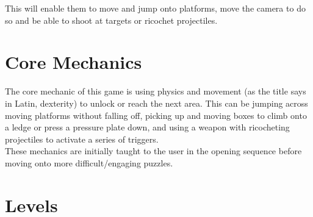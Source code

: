 \documentclass[11pt]{article}
\begin{document}
This will enable them to move and jump onto platforms, move the camera to do so and be able to shoot at targets or ricochet projectiles.

\section{Core Mechanics}

The core mechanic of this game is using physics and movement (as the title says in Latin, dexterity) to unlock or reach the next area. This can be jumping across moving platforms without falling off, picking up and moving boxes to climb onto a ledge or press a pressure plate down, and using a weapon with ricocheting projectiles to activate a series of triggers. \\

These mechanics are initially taught to the user in the opening sequence before moving onto more difficult/engaging puzzles.


\section{Levels}
\end{document}
